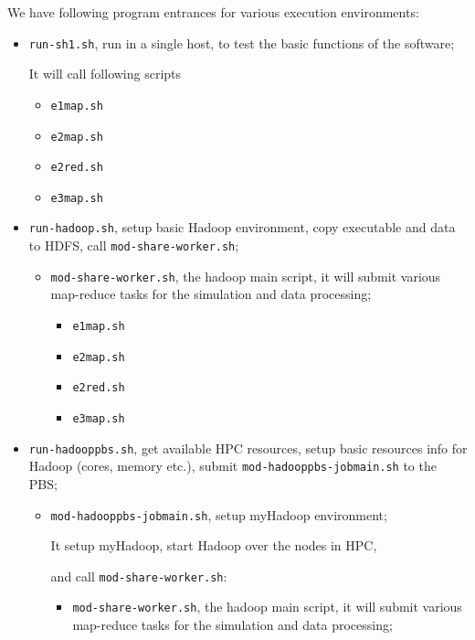 We have following program entrances for various execution environments:

\begin{itemize}
  \item \texttt{run-sh1.sh}, run in a single host, to test the basic functions of the software;


    It will call following scripts
    \begin{itemize}
      \item \texttt{e1map.sh}
      \item \texttt{e2map.sh}
      \item \texttt{e2red.sh}
      \item \texttt{e3map.sh}
    \end{itemize}
  \item \texttt{run-hadoop.sh}, setup basic Hadoop environment, copy executable and data to HDFS, call \texttt{mod-share-worker.sh};
    \begin{itemize}
      \item \texttt{mod-share-worker.sh}, the hadoop main script, it will submit various map-reduce tasks for the simulation and data processing;
        \begin{itemize}
          \item \texttt{e1map.sh}
          \item \texttt{e2map.sh}
          \item \texttt{e2red.sh}
          \item \texttt{e3map.sh}
        \end{itemize}
    \end{itemize}

  \item \texttt{run-hadooppbs.sh}, get available HPC resources, setup basic resources info for Hadoop (cores, memory etc.), submit \texttt{mod-hadooppbs-jobmain.sh} to the PBS;

    \begin{itemize}
      \item \texttt{mod-hadooppbs-jobmain.sh}, setup myHadoop environment;

        It setup myHadoop, start Hadoop over the nodes in HPC,

        and call \texttt{mod-share-worker.sh}:
        \begin{itemize}
          \item \texttt{mod-share-worker.sh}, the hadoop main script, it will submit various map-reduce tasks for the simulation and data processing;


\end{itemize}
\end{itemize}
\end{itemize}
